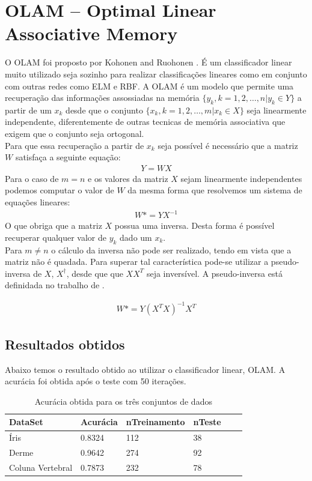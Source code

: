 \documentclass[
	article,			%
	11pt,				%
	oneside,			%
	a4paper,			%
	english,			%
	brazil,				%
	sumario=tradicional
	]{abntex2}
\begin{document}
\section*{OLAM – Optimal Linear Associative Memory} 
O OLAM foi proposto por
Kohonen and Ruohonen \cite{OLAM_1}. É um classificador linear muito utilizado
seja sozinho para realizar classificações lineares como em conjunto com outras
redes como ELM e RBF. A OLAM é um modelo que permite uma recuperação das
informações assossiadas na memória $\{y_k,k=1,2,\ldots,n|y_k\in Y\}$ a partir de
um $x_k$ desde que o conjunto $\{x_k,k=1,2,\ldots,m|x_k \in X\}$ seja
linearmente independente, diferentemente de outras tecnicas de memória
associativa que exigem que o conjunto seja ortogonal.\\
Para que essa recuperação a partir de $x_k$ seja possível é necessário que a
matriz $W$ satisfaça a seguinte equação:
\begin{align}
Y=WX
\end{align}
Para o caso de $m=n$ e os valores da matriz $X$ sejam linearmente independentes
podemos computar o valor de $W$ da mesma forma que resolvemos um sistema de
equações lineares:
\begin{align}
W*=YX^{-1}
\end{align}
O que obriga que a matriz $X$ possua uma inversa. Desta forma é possível
recuperar qualquer valor de $y_k$ dado um $x_k$.
\\
Para $m \neq n$ o cálculo da inversa não pode ser realizado, tendo em vista que
a matriz não é quadada. Para superar tal característica pode-se utilizar a
pseudo-inversa de $X$, $X^{\dagger}$, desde que que $XX^T$ seja inversível. A
pseudo-inversa está definidada no trabalho de \cite{penrose_1}.

\begin{align}
W*=Y(X^TX)^{-1}X^T
\end{align}
\subsection*{Resultados obtidos}
Abaixo temos o resultado obtido ao utilizar o classificador linear, OLAM.
A acurácia foi obtida após o teste com 50 iterações.

\begin{table}[h]
\centering
	\begin{tabular}{|l|l|l|l|l|l|}
	\hline
	DataSet          & Acurácia & nTreinamento & nTeste \\ \hline
	Íris             & 0.8324   & 112          & 38     \\\hline 
	Derme     		 & 0.9642   & 274          & 92     \\ \hline
	Coluna Vertebral & 0.7873   & 232          & 78     \\
	\hline
	\end{tabular}
	\caption{Acurácia obtida para os três conjuntos de dados}
\end{table}  
   
\end{document}
